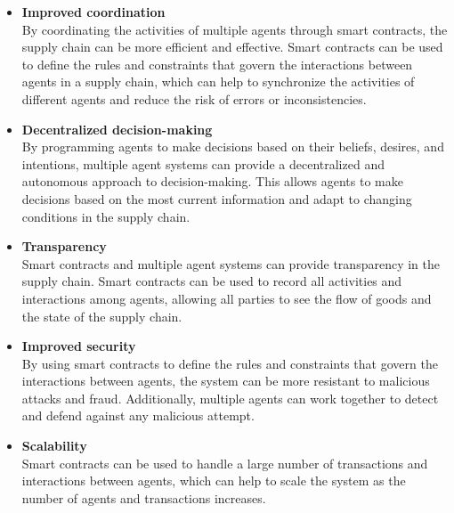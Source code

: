 \begin{itemize}
    
\item \textbf{Improved coordination} \\ By coordinating the activities of multiple agents through smart contracts, the supply chain can be more efficient and effective. Smart contracts can be used to define the rules and constraints that govern the interactions between agents in a supply chain, which can help to synchronize the activities of different agents and reduce the risk of errors or inconsistencies.

\vspace{.5cm}

\item \textbf{Decentralized decision-making} \\ By programming agents to make decisions based on their beliefs, desires, and intentions, multiple agent systems can provide a decentralized and autonomous approach to decision-making. This allows agents to make decisions based on the most current information and adapt to changing conditions in the supply chain.

\vspace{.5cm}

\item \textbf{Transparency} \\ Smart contracts and multiple agent systems can provide transparency in the supply chain. Smart contracts can be used to record all activities and interactions among agents, allowing all parties to see the flow of goods and the state of the supply chain.

\vspace{.5cm}

\item \textbf{Improved security} \\ By using smart contracts to define the rules and constraints that govern the interactions between agents, the system can be more resistant to malicious attacks and fraud. Additionally, multiple agents can work together to detect and defend against any malicious attempt.

\vspace{.5cm}

\item \textbf{Scalability} \\ Smart contracts can be used to handle a large number of transactions and interactions between agents, which can help to scale the system as the number of agents and transactions increases.


\end{itemize}
